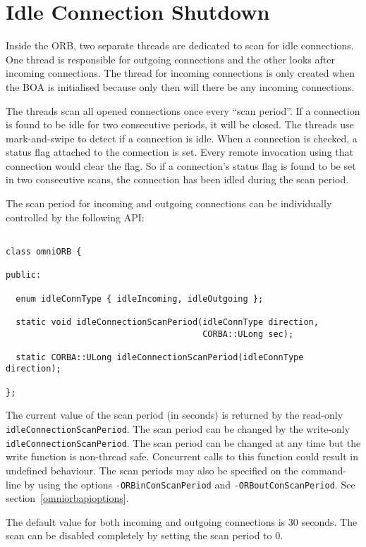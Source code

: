 \documentclass[11pt,twoside,onecolumn]{book}
\begin{document}
\section{Idle Connection Shutdown}
\label{sec_shut}

Inside the ORB, two separate threads are dedicated to scan for idle
connections. One thread is responsible for outgoing connections and the
other looks after incoming connections. The thread for incoming connections
is only created when the BOA is initialised because only then will there be
any incoming connections.

The threads scan all opened connections once every ``scan period''. If a
connection is found to be idle for two consecutive periods, it will be
closed. The threads use mark-and-swipe to detect if a connection is idle.
When a connection is checked, a status flag attached to the connection is
set. Every remote invocation using that connection would clear the flag. So
if a connection's status flag is found to be set in two consecutive scans,
the connection has been idled during the  scan period.

The scan period for incoming and outgoing connections can be individually
controlled by the following API:

{\small
\begin{verbatim}

class omniORB {

public:

  enum idleConnType { idleIncoming, idleOutgoing };

  static void idleConnectionScanPeriod(idleConnType direction,
                                       CORBA::ULong sec);

  static CORBA::ULong idleConnectionScanPeriod(idleConnType direction);

};

\end{verbatim}
}

The current value of the scan period (in seconds) is returned by the
read-only {\tt idleConnectionScanPeriod}. The scan period can be changed by
the write-only {\tt idleConnectionScanPeriod}. The scan period can be changed
at any time but the write function is non-thread safe. Concurrent calls to this
function could result in undefined behaviour.
The scan periods may also be specified on the command-line by using the
options {\tt -ORBinConScanPeriod} and {\tt -ORBoutConScanPeriod}. See
section~\ref{omniorbapioptions}.

The default value for both incoming and outgoing connections is 30 seconds.
The scan can be disabled completely by setting the scan period to 0.
\end{document}
